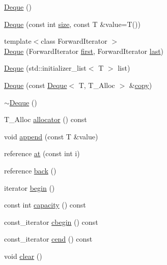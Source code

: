 \begin{DoxyCompactItemize}
\item 
\hyperlink{namespaceprism_1_1aux_a73d05f9bac6f1390e68c9ca400dd90b7}{Deque} ()
\item 
\hyperlink{namespaceprism_1_1aux_a86a5a427044a1cfe6e053583d511f8e0}{Deque} (const int \hyperlink{namespaceprism_1_1aux_a7311aa21cf3af7c4639ea15e4716de1b}{size}, const T \&value=T())
\item 
{\footnotesize template$<$class Forward\+Iterator $>$ }\\\hyperlink{namespaceprism_1_1aux_a4342187804b1509fa1d43846e5049897}{Deque} (Forward\+Iterator \hyperlink{namespaceprism_1_1aux_a16674f8b7bafe0844292be51e17dafa1}{first}, Forward\+Iterator \hyperlink{namespaceprism_1_1aux_a23a89c64fd9ee1f27799fe56c943a44d}{last})
\item 
\hyperlink{namespaceprism_1_1aux_a806cef943a9796d8296803dbc3922a85}{Deque} (std\+::initializer\+\_\+list$<$ T $>$ list)
\item 
\hyperlink{namespaceprism_1_1aux_ae67fb1e567d8a9d942bea9ca8271b45b}{Deque} (const \hyperlink{classprism_1_1_deque}{Deque}$<$ T, T\+\_\+\+Alloc $>$ \&\hyperlink{namespaceprism_ae776f4cd825f79e7af1cf6ee1d90a209}{copy})
\item 
\hyperlink{namespaceprism_1_1aux_acad2ea6cf2b13bf2f38d16c4cac830e5}{$\sim$\+Deque} ()
\item 
T\+\_\+\+Alloc \hyperlink{namespaceprism_1_1aux_a436e9fe301b9cce4f865df50792524a9}{allocator} () const 
\item 
void \hyperlink{namespaceprism_1_1aux_ae49493cdeebd18bd65b9c54934f13084}{append} (const T \&value)
\item 
reference \hyperlink{namespaceprism_1_1aux_ad5eb3c4af48fe544355159d8e9605c89}{at} (const int i)
\item 
reference \hyperlink{namespaceprism_1_1aux_a7e806dafa121b876ac0eabec88c93c13}{back} ()
\item 
iterator \hyperlink{namespaceprism_1_1aux_aae231a907fc705af50c90313e7f16ad0}{begin} ()
\item 
const int \hyperlink{namespaceprism_1_1aux_a69b79e5620215d2439c5f35cc2a945fe}{capacity} () const 
\item 
const\+\_\+iterator \hyperlink{namespaceprism_1_1aux_a0ad8a6ad4b9b8416c05fdee349208d4c}{cbegin} () const 
\item 
const\+\_\+iterator \hyperlink{namespaceprism_1_1aux_ad6206fca04277236c2d6edd497c2bf22}{cend} () const 
\item 
void \hyperlink{namespaceprism_1_1aux_af9dfe6df22b5b28d81a024a6bbc319c3}{clear} ()

\end{DoxyCompactItemize}
